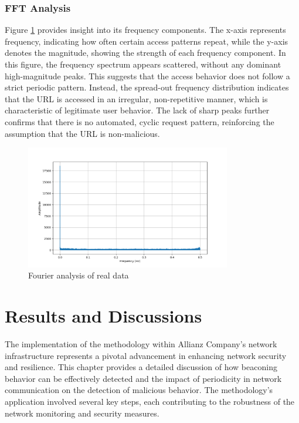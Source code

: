 \subsection{FFT Analysis}

Figure \ref{fig:fourierrealdata} provides insight into its frequency components. The x-axis represents frequency, indicating how often certain access patterns repeat, while the y-axis denotes the magnitude, showing the strength of each frequency component. In this figure, the frequency spectrum appears scattered, without any dominant high-magnitude peaks. This suggests that the access behavior does not follow a strict periodic pattern. Instead, the spread-out frequency distribution indicates that the URL is accessed in an irregular, non-repetitive manner, which is characteristic of legitimate user behavior. The lack of sharp peaks further confirms that there is no automated, cyclic request pattern, reinforcing the assumption that the URL is non-malicious.

\begin{figure}
    \centering
    \includegraphics[width=0.8\textwidth]{../Thesis_Docs/media/fourier-realdata.png}
    \caption{Fourier analysis of real data}
    \label{fig:fourierrealdata}
\end{figure}

\chapter{Results and Discussions}
The implementation of the methodology within Allianz Company’s network infrastructure represents a pivotal advancement in enhancing network security and resilience. This chapter provides a detailed discussion of how beaconing behavior can be effectively detected and the impact of periodicity in network communication on the detection of malicious behavior. The methodology’s application involved several key steps, each contributing to the robustness of the network monitoring and security measures.

